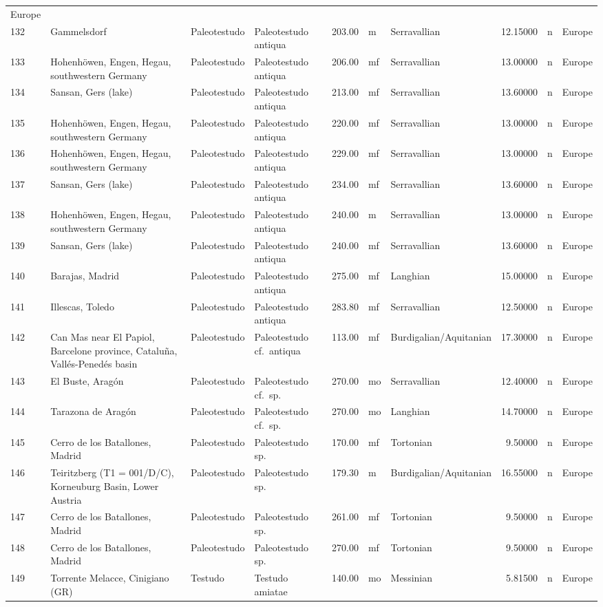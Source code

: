 \documentclass[]{article}
\begin{document}
\begin{longtable}[]{@{}llllrllrll@{}}
Europe\tabularnewline
132 & Gammelsdorf & Paleotestudo & Paleotestudo antiqua & 203.00 & m &
Serravallian & 12.15000 & n & Europe\tabularnewline
133 & Hohenhöwen, Engen, Hegau, southwestern Germany & Paleotestudo &
Paleotestudo antiqua & 206.00 & mf & Serravallian & 13.00000 & n &
Europe\tabularnewline
134 & Sansan, Gers (lake) & Paleotestudo & Paleotestudo antiqua & 213.00
& mf & Serravallian & 13.60000 & n & Europe\tabularnewline
135 & Hohenhöwen, Engen, Hegau, southwestern Germany & Paleotestudo &
Paleotestudo antiqua & 220.00 & mf & Serravallian & 13.00000 & n &
Europe\tabularnewline
136 & Hohenhöwen, Engen, Hegau, southwestern Germany & Paleotestudo &
Paleotestudo antiqua & 229.00 & mf & Serravallian & 13.00000 & n &
Europe\tabularnewline
137 & Sansan, Gers (lake) & Paleotestudo & Paleotestudo antiqua & 234.00
& mf & Serravallian & 13.60000 & n & Europe\tabularnewline
138 & Hohenhöwen, Engen, Hegau, southwestern Germany & Paleotestudo &
Paleotestudo antiqua & 240.00 & m & Serravallian & 13.00000 & n &
Europe\tabularnewline
139 & Sansan, Gers (lake) & Paleotestudo & Paleotestudo antiqua & 240.00
& mf & Serravallian & 13.60000 & n & Europe\tabularnewline
140 & Barajas, Madrid & Paleotestudo & Paleotestudo antiqua & 275.00 &
mf & Langhian & 15.00000 & n & Europe\tabularnewline
141 & Illescas, Toledo & Paleotestudo & Paleotestudo antiqua & 283.80 &
mf & Serravallian & 12.50000 & n & Europe\tabularnewline
142 & Can Mas near El Papiol, Barcelone province, Cataluña,
Vallés-Penedés basin & Paleotestudo & Paleotestudo cf.~antiqua & 113.00
& mf & Burdigalian/Aquitanian & 17.30000 & n & Europe\tabularnewline
143 & El Buste, Aragón & Paleotestudo & Paleotestudo cf.~sp. & 270.00 &
mo & Serravallian & 12.40000 & n & Europe\tabularnewline
144 & Tarazona de Aragón & Paleotestudo & Paleotestudo cf.~sp. & 270.00
& mo & Langhian & 14.70000 & n & Europe\tabularnewline
145 & Cerro de los Batallones, Madrid & Paleotestudo & Paleotestudo sp.
& 170.00 & mf & Tortonian & 9.50000 & n & Europe\tabularnewline
146 & Teiritzberg (T1 = 001/D/C), Korneuburg Basin, Lower Austria &
Paleotestudo & Paleotestudo sp. & 179.30 & m & Burdigalian/Aquitanian &
16.55000 & n & Europe\tabularnewline
147 & Cerro de los Batallones, Madrid & Paleotestudo & Paleotestudo sp.
& 261.00 & mf & Tortonian & 9.50000 & n & Europe\tabularnewline
148 & Cerro de los Batallones, Madrid & Paleotestudo & Paleotestudo sp.
& 270.00 & mf & Tortonian & 9.50000 & n & Europe\tabularnewline
149 & Torrente Melacce, Cinigiano (GR) & Testudo & Testudo amiatae &
140.00 & mo & Messinian & 5.81500 & n & Europe\tabularnewline

\end{longtable}
\end{document}

